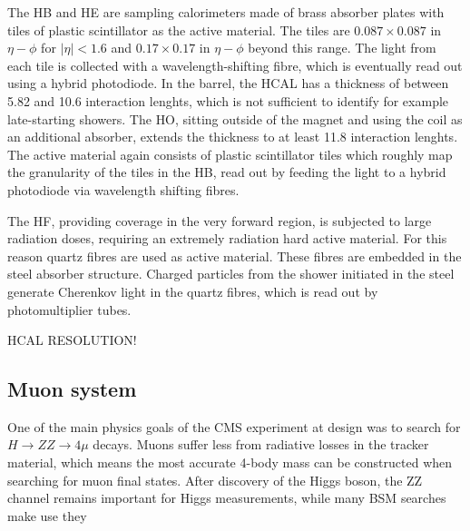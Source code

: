 The \ac{HB} and \ac{HE} are sampling calorimeters made of brass absorber
plates with tiles of plastic scintillator as the active material. The tiles 
are $0.087 \times 0.087$ in $\eta-\phi$ for $|\eta|<1.6$ and $0.17\times0.17$ in $\eta-\phi$
beyond this range.
The light from each tile is collected with a wavelength-shifting fibre, 
which is eventually read out using a hybrid photodiode. In the barrel, the \ac{HCAL}
has a thickness of between 5.82 and 10.6 interaction lenghts, which is not 
sufficient to identify for example late-starting showers. The \ac{HO}, sitting
outside of the magnet and using the coil as an additional absorber, extends the 
thickness to at least 11.8 interaction lenghts. 
The active material again consists of plastic scintillator tiles which roughly
map the granularity of the tiles in the \ac{HB}, read out by feeding the light
to a hybrid photodiode via wavelength shifting fibres.

The \ac{HF}, providing coverage in the very forward region, is 
subjected to large radiation doses, requiring an extremely
radiation hard active material. For this reason quartz
fibres are used as active material. These fibres are embedded
in the steel absorber structure. Charged particles from the
shower initiated in the steel generate Cherenkov light in 
the quartz fibres, which is read out by photomultiplier tubes.

HCAL RESOLUTION!



\subsection{Muon system}
\label{sec:CMSLHC_CMS_muons}
One of the main physics goals of the \ac{CMS} experiment
at design was to search for $H\rightarrow ZZ\rightarrow 4\mu$ decays. Muons
suffer less from radiative losses in the tracker material, which means the most accurate
4-body mass can be constructed when searching for muon final states.
After discovery of the Higgs boson, the ZZ channel remains important
for Higgs measurements, while many \ac{BSM} searches make use 
they 


